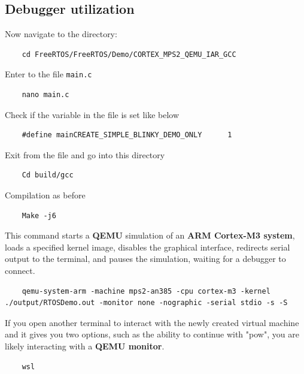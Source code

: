 \documentclass{exam}
\begin{document}
\subsection{Debugger utilization}
Now navigate to the directory:
\begin{lstlisting}
    cd FreeRTOS/FreeRTOS/Demo/CORTEX_MPS2_QEMU_IAR_GCC   
\end{lstlisting}
Enter to the file \texttt{main.c}
\begin{lstlisting}
    nano main.c
\end{lstlisting}
Check if the variable in the file is set like below
\begin{lstlisting}
    #define mainCREATE_SIMPLE_BLINKY_DEMO_ONLY      1
\end{lstlisting}
Exit from the file and go into this directory
\begin{lstlisting}
    Cd build/gcc
\end{lstlisting}
Compilation as before
\begin{lstlisting}
    Make -j6
\end{lstlisting}
This command starts a \textbf{QEMU} simulation of an \textbf{ARM Cortex-M3 system}, loads a specified kernel image, disables the graphical interface, redirects serial output to the terminal, and pauses the simulation, waiting for a debugger to connect.
\begin{lstlisting}
    qemu-system-arm -machine mps2-an385 -cpu cortex-m3 -kernel ./output/RTOSDemo.out -monitor none -nographic -serial stdio -s -S
\end{lstlisting}
If you open another terminal to interact with the newly created virtual machine and it gives you two options, such as the ability to continue with "pow", you are likely interacting with a \textbf{QEMU monitor}.
\begin{lstlisting}
    wsl 
\end{lstlisting}
\end{document}
